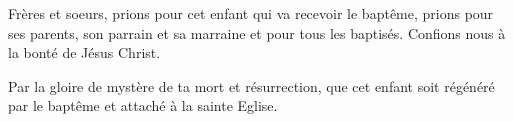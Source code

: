  Frères et soeurs, prions pour cet enfant
qui va recevoir le baptême, prions pour ses parents, son parrain
et sa marraine et pour tous les baptisés. Confions nous à la bonté
de Jésus Christ.

 Par la gloire de mystère de ta mort et résurrection,
que cet enfant soit régénéré par le baptême et attaché à la sainte Eglise.
